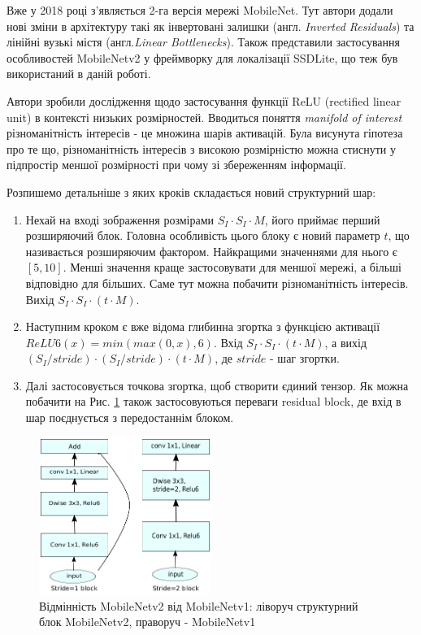 Вже у 2018 році з'являється 2-га версія мережі MobileNet. Тут автори додали нові зміни в
архітектуру такі як інвертовані залишки (англ. \textit{Inverted Residuals}) та
лінійні вузькі містя (англ.\textit{Linear Bottlenecks}). Також представили застосування
особливостей MobileNetv2 у фреймворку для локалізації SSDLite, що теж був використаний
в даній роботі.

Автори зробили дослідження щодо застосування функції ReLU (rectified linear unit) в
контексті низьких розмірностей. Вводиться поняття \textit{manifold of interest}
різноманітність інтересів - це множина шарів активацій. Була висунута гіпотеза про те що,
різноманітність інтересів з високою розмірністю можна стиснути у підпростір меншої розмірності при
чому зі збереженням інформації.

Розпишемо детальніше з яких кроків складається новий структурний шар:


\begin{enumerate}
    \item Нехай на вході зображення розмірами $S_I · S_I · M$, його приймає перший розширяючий блок.
          Головна особливість цього блоку є новий параметр $t$, що називається розширяючим фактором.
          Найкращими значеннями для нього є $[5,10]$. Менші значення краще застосовувати для меншої мережі,
          а більші відповідно для більших. Саме тут можна побачити різноманітність інтересів.
          Вихід $S_I · S_I · (t·M)$.
    \item Наступним кроком є вже відома глибинна згортка з функцією активації $ReLU6(x) =  min(max(0,x),6)$.
          Вхід $S_I · S_I · (t·M)$, а вихід $(S_I/stride) · (S_I/stride) · (t·M)$, де  $stride$ - шаг згортки.
    \item Далі застосовується точкова згортка, щоб створити єдиний тензор. Як можна побачити на
          Рис. \ref{fig:cnn:mobilenetv2_layer} також застосовуються переваги residual block, де вхід в шар
          поєднується з передостаннім блоком.
\end{enumerate}


\begin{figure}[H]
    \centering
    \includegraphics[width=0.5\textwidth]{images/cnn_mobilenetv2_layer}
    \caption{Відмінність MobileNetv2 від MobileNetv1: ліворуч структурний блок MobileNetv2,
        праворуч - MobileNetv1   \cite{mobilenetv2}
        \label{fig:cnn:mobilenetv2_layer}
    }
\end{figure}

